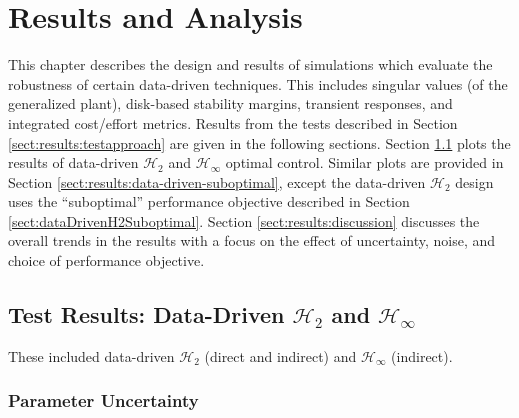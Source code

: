 \chapter{Results and Analysis}
\label{chap:results}
This chapter describes the design and results of simulations which evaluate the robustness of certain data-driven techniques.  This includes singular values (of the generalized plant), disk-based stability margins, transient responses, and integrated cost/effort metrics.  Results from the tests described in Section \ref{sect:results:testapproach} are given in the following sections.  Section \ref{sect:results:data-driven-optimal} plots the results of data-driven $\mathcal{H}_{2}$ and $\mathcal{H}_{\infty}$ optimal control.  Similar plots are provided in Section \ref{sect:results:data-driven-suboptimal}, except the data-driven $\mathcal{H}_{2}$ design uses the ``suboptimal'' performance objective described in Section \ref{sect:dataDrivenH2Suboptimal}.  Section \ref{sect:results:discussion} discusses the overall trends in the results with a focus on the effect of uncertainty, noise, and choice of performance objective.

\newpage
\section{Test Results: Data-Driven $\mathcal{H}_{2}$ and $\mathcal{H}_{\infty}$}
\label{sect:results:data-driven-optimal}
These included data-driven $\mathcal{H}_{2}$ (direct and indirect) and $\mathcal{H}_{\infty}$ (indirect).
\subsection{Parameter Uncertainty}
